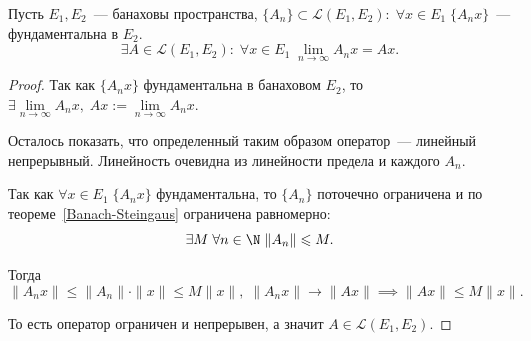 \begin{theorem}
    Пусть $E_1, E_2$~--- банаховы пространства, $\{A_n\} \subset \mathcal{L}(E_1, E_2):\; \forall x \in E_1\; \{A_n x\}$~--- фундаментальна в $E_2$.\\
    \[\exists A \in \mathcal{L}(E_1, E_2):\; \forall x \in E_1\; \lim\limits_{n \to \infty} A_n x = Ax.\]
\end{theorem}
\begin{proof}
    Так как $\{A_n x\}$ фундаментальна в банаховом $E_2$, то $\exists \lim\limits_{n \to \infty} A_n x,\; Ax := \lim\limits_{n \to \infty} A_n x$.

    Осталось показать, что определенный таким образом оператор~--- линейный непрерывный. Линейность очевидна из линейности предела и каждого $A_n$. 

    Так как $\forall x \in E_1\; \{A_n x\}$ фундаментальна, то $\{A_n\}$ поточечно ограничена и по теореме~\ref{Banach-Steingaus} ограничена равномерно:
    \[\exists M\; \forall n \in \N \; \|A_n\| \leqslant M.\]

    Тогда
    \[\|A_n x\| \leqslant \|A_n\| \cdot \|x\| \leqslant M\|x\|,\; \|A_nx\| \to \|Ax\| \implies \|Ax\| \leqslant M\|x\|.\]
    
    То есть оператор ограничен и непрерывен, а значит $A \in \mathcal{L}(E_1, E_2).$
\end{proof}

